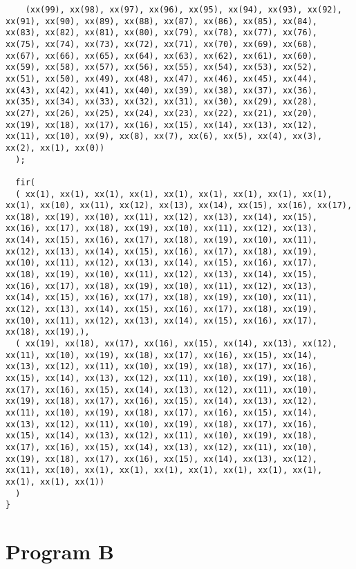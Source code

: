 \documentclass[msc,lith,english]{liuthesis}
\begin{document}
\begin{verbatim}
    (xx(99), xx(98), xx(97), xx(96), xx(95), xx(94), xx(93), xx(92), xx(91), xx(90), xx(89), xx(88), xx(87), xx(86), xx(85), xx(84), xx(83), xx(82), xx(81), xx(80), xx(79), xx(78), xx(77), xx(76), xx(75), xx(74), xx(73), xx(72), xx(71), xx(70), xx(69), xx(68), xx(67), xx(66), xx(65), xx(64), xx(63), xx(62), xx(61), xx(60), xx(59), xx(58), xx(57), xx(56), xx(55), xx(54), xx(53), xx(52), xx(51), xx(50), xx(49), xx(48), xx(47), xx(46), xx(45), xx(44), xx(43), xx(42), xx(41), xx(40), xx(39), xx(38), xx(37), xx(36), xx(35), xx(34), xx(33), xx(32), xx(31), xx(30), xx(29), xx(28), xx(27), xx(26), xx(25), xx(24), xx(23), xx(22), xx(21), xx(20), xx(19), xx(18), xx(17), xx(16), xx(15), xx(14), xx(13), xx(12), xx(11), xx(10), xx(9), xx(8), xx(7), xx(6), xx(5), xx(4), xx(3), xx(2), xx(1), xx(0))
  );

  fir(
  ( xx(1), xx(1), xx(1), xx(1), xx(1), xx(1), xx(1), xx(1), xx(1), xx(1), xx(10), xx(11), xx(12), xx(13), xx(14), xx(15), xx(16), xx(17), xx(18), xx(19), xx(10), xx(11), xx(12), xx(13), xx(14), xx(15), xx(16), xx(17), xx(18), xx(19), xx(10), xx(11), xx(12), xx(13), xx(14), xx(15), xx(16), xx(17), xx(18), xx(19), xx(10), xx(11), xx(12), xx(13), xx(14), xx(15), xx(16), xx(17), xx(18), xx(19), xx(10), xx(11), xx(12), xx(13), xx(14), xx(15), xx(16), xx(17), xx(18), xx(19), xx(10), xx(11), xx(12), xx(13), xx(14), xx(15), xx(16), xx(17), xx(18), xx(19), xx(10), xx(11), xx(12), xx(13), xx(14), xx(15), xx(16), xx(17), xx(18), xx(19), xx(10), xx(11), xx(12), xx(13), xx(14), xx(15), xx(16), xx(17), xx(18), xx(19), xx(10), xx(11), xx(12), xx(13), xx(14), xx(15), xx(16), xx(17), xx(18), xx(19),),
  ( xx(19), xx(18), xx(17), xx(16), xx(15), xx(14), xx(13), xx(12), xx(11), xx(10), xx(19), xx(18), xx(17), xx(16), xx(15), xx(14), xx(13), xx(12), xx(11), xx(10), xx(19), xx(18), xx(17), xx(16), xx(15), xx(14), xx(13), xx(12), xx(11), xx(10), xx(19), xx(18), xx(17), xx(16), xx(15), xx(14), xx(13), xx(12), xx(11), xx(10), xx(19), xx(18), xx(17), xx(16), xx(15), xx(14), xx(13), xx(12), xx(11), xx(10), xx(19), xx(18), xx(17), xx(16), xx(15), xx(14), xx(13), xx(12), xx(11), xx(10), xx(19), xx(18), xx(17), xx(16), xx(15), xx(14), xx(13), xx(12), xx(11), xx(10), xx(19), xx(18), xx(17), xx(16), xx(15), xx(14), xx(13), xx(12), xx(11), xx(10), xx(19), xx(18), xx(17), xx(16), xx(15), xx(14), xx(13), xx(12), xx(11), xx(10), xx(1), xx(1), xx(1), xx(1), xx(1), xx(1), xx(1), xx(1), xx(1), xx(1))
  )
}
\end{verbatim}

\section{Program B}
\end{document}
